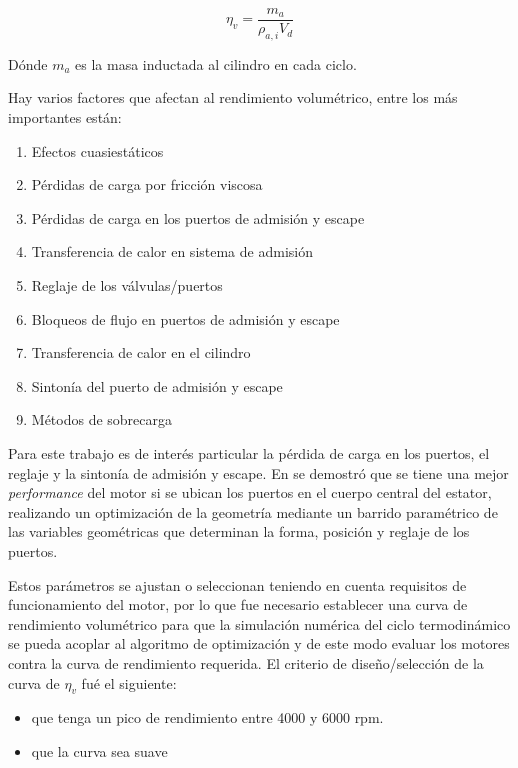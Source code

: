 \begin{equation}
    \label{eq:rendVol2}
    \eta_v = \frac{m_a}{\rho_{a,i} V_d}
\end{equation}

Dónde $m_a$ es la masa inductada al cilindro en cada ciclo.

Hay varios factores que afectan al rendimiento volumétrico, entre los más
importantes están:
%
\begin{enumerate}
    \item Efectos cuasiestáticos
    \item Pérdidas de carga por fricción viscosa
    \item Pérdidas de carga en los puertos de admisión y escape
    \item Transferencia de calor en sistema de admisión
    \item Reglaje de los válvulas/puertos
    \item Bloqueos de flujo en puertos de admisión y escape
    \item Transferencia de calor en el cilindro
    \item Sintonía del puerto de admisión y escape
    \item Métodos de sobrecarga 
\end{enumerate}

Para este trabajo es de interés particular la pérdida de carga en los puertos,
el reglaje y la sintonía de admisión y escape.
%
En \cite{lopez13} se demostró que se tiene una mejor \emph{performance} del
motor si se ubican los puertos en el cuerpo central del estator, realizando un
optimización de la geometría mediante un barrido paramétrico de las variables
geométricas que determinan la forma, posición y reglaje de los puertos.
%

Estos parámetros se ajustan o seleccionan teniendo en cuenta requisitos de
funcionamiento del motor, por lo que fue necesario establecer una curva de
rendimiento volumétrico para que la simulación numérica del
ciclo termodinámico se pueda acoplar al algoritmo de optimización y de este
modo evaluar los motores contra la curva de rendimiento requerida.
%
El criterio de diseño/selección de la curva de $\eta_v$ fué el siguiente:

\begin{itemize}
  \item que tenga un pico de rendimiento entre 4000 y 6000 rpm.
  \item que la curva sea suave
\end{itemize}

